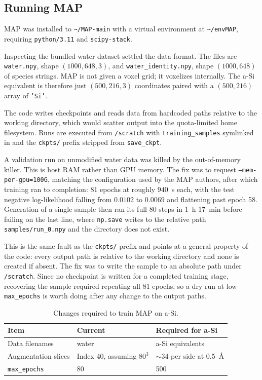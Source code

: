 \documentclass{article}
\begin{document}
\subsection{Running MAP}

MAP was installed to \texttt{\textasciitilde/MAP-main} with a virtual environment at \texttt{\textasciitilde/envMAP}, requiring \texttt{python/3.11} and \texttt{scipy-stack}.

Inspecting the bundled water dataset settled the data format. The files are \texttt{water.npy}, shape $(1000, 648, 3)$, and \texttt{water\_identity.npy}, shape $(1000, 648)$ of species strings. MAP is not given a voxel grid; it voxelizes internally. The a-Si equivalent is therefore just $(500, 216, 3)$ coordinates paired with a $(500, 216)$ array of \texttt{'Si'}.

The code writes checkpoints and reads data from hardcoded paths relative to the working directory, which would scatter output into the quota-limited home filesystem. Runs are executed from \texttt{/scratch} with \texttt{training\_samples} symlinked in and the \texttt{ckpts/} prefix stripped from \texttt{save\_ckpt}.

A validation run on unmodified water data was killed by the out-of-memory killer. This is host RAM rather than GPU memory. The fix was to request \texttt{--mem-per-gpu=100G}, matching the configuration used by the MAP authors, after which training ran to completion: 81 epochs at roughly $940$~s each, with the test negative log-likelihood falling from $0.0102$ to $0.0069$ and flattening past epoch 58. Generation of a single sample then ran its full 80 steps in 1~h 17~min before failing on the last line, where \texttt{np.save} writes to the relative path \texttt{samples/run\_0.npy} and the directory does not exist.

This is the same fault as the \texttt{ckpts/} prefix and points at a general property of the code: every output path is relative to the working directory and none is created if absent. The fix was to write the sample to an absolute path under \texttt{/scratch}. Since no checkpoint is written for a completed training stage, recovering the sample required repeating all 81 epochs, so a dry run at low \texttt{max\_epochs} is worth doing after any change to the output paths.

\begin{table}[H]
\centering
\small
\begin{tabular}{p{}|p{}|p{}}
\toprule
Item & Current & Required for a-Si \\
\midrule
Data filenames & water & a-Si equivalents \\
\hline
Augmentation slices & Index 40, assuming $80^3$ & $\sim$34 per side at 0.5~\AA \\
\hline
\texttt{max\_epochs} & 80 & 500 \\
\bottomrule
\end{tabular}
\caption{Changes required to train MAP on a-Si.}
\label{tab:map_changes}
\end{table}
\end{document}
